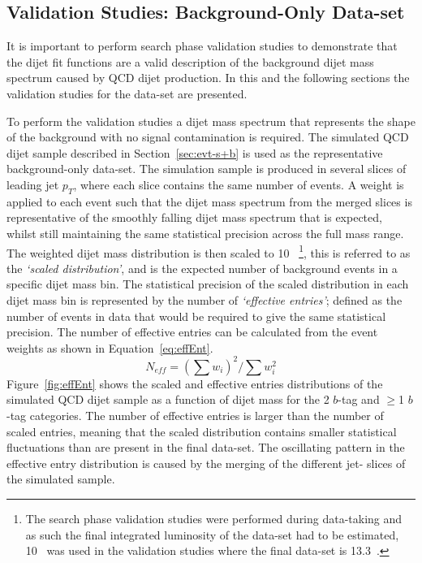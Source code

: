 \subsection{Validation Studies: Background-Only Data-set}
\label{sec:bkg-summer_fitCR}

It is important to perform search phase validation studies to demonstrate
that the dijet fit functions are a valid description of the background dijet mass spectrum caused by QCD dijet production.
In this and the following sections the validation studies for the \summer{} data-set are presented.

To perform the validation studies a dijet mass spectrum that represents the shape of the background with no signal contamination is required.
The simulated QCD dijet sample described in Section~\ref{sec:evt-s+b} is used as the representative background-only data-set.
The simulation sample is produced in several slices of leading jet $p_{T}$, where each slice contains the same number of events.
A weight is applied to each event such that the dijet mass spectrum from the merged slices is representative of the smoothly falling dijet mass spectrum that is expected,
whilst still maintaining the same statistical precision across the full mass range.
The weighted dijet mass distribution is then scaled to 10~\ifb{}
\footnote{
  The search phase validation studies were performed during data-taking
  and as such the final integrated luminosity of the data-set had to be estimated,
  10~\ifb{} was used in the validation studies where the final data-set is 13.3~\ifb{}.
},
this is referred to as the \textit{`scaled distribution'}, and is the expected number of background events in a specific dijet mass bin. 
The statistical precision of the scaled distribution in each dijet mass bin is represented by the number of \textit{`effective entries'};
defined as the number of events in data that would be required to give the same statistical precision.
 The number of effective entries can be calculated from the event weights as shown in Equation~\ref{eq:effEnt}.
\begin{equation}
  N_{eff} = (\sum{w_i})^2 / \sum{w_i^2}
  \label{eq:effEnt}
\end{equation}
Figure~\ref{fig:effEnt} shows the scaled and effective entries distributions of the simulated QCD dijet sample
as a function of dijet mass for the 2 $b$-tag and $\geq$1 $b$-tag categories.
The number of effective entries is larger than the number of scaled entries,
meaning that the scaled distribution contains smaller statistical fluctuations than are present in the final data-set.
The oscillating pattern in the effective entry distribution is caused by the merging of the different jet-\pT{} slices of the simulated sample. 

